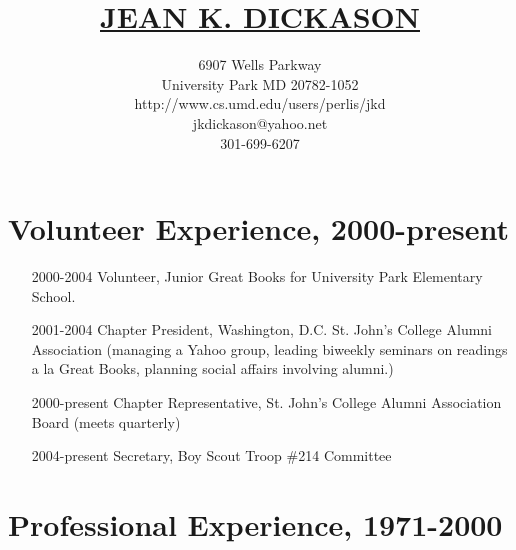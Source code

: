 \documentclass[fullpage,12pt]{article}
\title{\Large \bf \underline{JEAN K. DICKASON}}
\author{6907 Wells Parkway\\
        University Park MD 20782-1052\\
	http://www.cs.umd.edu/users/perlis/jkd\\
        jkdickason@yahoo.net\\
        301-699-6207}
\begin{document}
\maketitle


	
\section{Volunteer Experience, 2000-present}
\begin{itemize}
\item[2000-2004]
Volunteer, Junior
Great Books for University Park Elementary School.

\item[2001-2004]
Chapter President, Washington, D.C. St. John's College Alumni Association
(managing a Yahoo group, leading biweekly seminars on readings a
la Great Books, planning social affairs involving alumni.)

\item[2000-present]
Chapter Representative, St. John's College Alumni Association Board (meets quarterly)

\item[2004-present]
Secretary, Boy Scout Troop \#214 Committee

\end{itemize}

\section{Professional Experience, 1971-2000}
\end{document}
